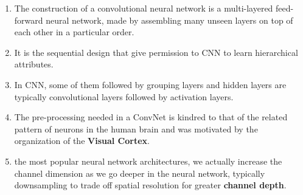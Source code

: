 \begin{enumerate}
    \item The construction of a convolutional neural network is a multi-layered feed-forward neural network, made by assembling many unseen layers on top of each other in a particular order.

    \item It is the sequential design that give permission to CNN to learn hierarchical attributes.
    
    \item In CNN, some of them followed by grouping layers and hidden layers are typically convolutional layers followed by activation layers.
    
    \item The pre-processing needed in a ConvNet is kindred to that of the related pattern of neurons in the human brain and was motivated by the organization of the \textbf{Visual Cortex}.

    \item  the most popular neural network architectures, we actually increase the channel dimension as we go deeper in the neural network, typically downsampling to trade off spatial resolution for greater \textbf{channel depth}.
\end{enumerate}




















